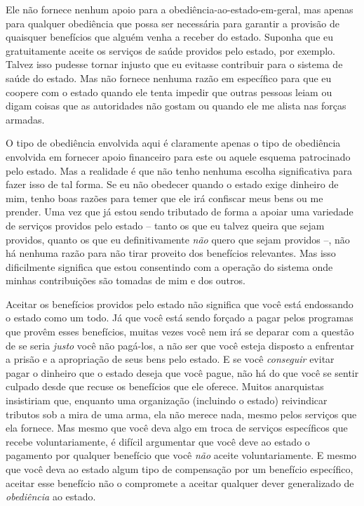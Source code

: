 Ele não fornece nenhum apoio para a obediência-ao-estado-em-geral, mas apenas para qualquer obediência que possa ser necessária para garantir a provisão de quaisquer benefícios que alguém venha a receber do estado. Suponha que eu gratuitamente aceite os serviços de saúde providos pelo estado, por exemplo. Talvez isso pudesse tornar injusto que eu evitasse contribuir para o sistema de saúde do estado. Mas não fornece nenhuma razão em específico para que eu coopere com o estado quando ele tenta impedir que outras pessoas leiam ou digam coisas que as autoridades não gostam ou quando ele me alista nas forças armadas.

O tipo de obediência envolvida aqui é claramente apenas o tipo de obediência envolvida em fornecer apoio financeiro para este ou aquele esquema patrocinado pelo estado. Mas a realidade é que não tenho nenhuma escolha significativa para fazer isso de tal forma. Se eu não obedecer quando o estado exige dinheiro de mim, tenho boas razões para temer que ele irá confiscar meus bens ou me prender. Uma vez que já estou sendo tributado de forma a apoiar uma variedade de serviços providos pelo estado -- tanto os que eu talvez queira que sejam providos, quanto os que eu definitivamente \emph{não} quero que sejam providos --, não há nenhuma razão para não tirar proveito dos benefícios relevantes. Mas isso dificilmente significa que estou consentindo com a operação do sistema onde minhas contribuições são tomadas de mim e dos outros.

Aceitar os benefícios providos pelo estado não significa que você está endossando o estado como um todo. Já que você está sendo forçado a pagar pelos programas que provêm esses benefícios, muitas vezes você nem irá se deparar com a questão de se seria \emph{justo} você não pagá-los, a não ser que você esteja disposto a enfrentar a prisão e a apropriação de seus bens pelo estado. E se você \emph{conseguir} evitar pagar o dinheiro que o estado deseja que você pague, não há do que você se sentir culpado desde que recuse os benefícios que ele oferece. Muitos anarquistas insistiriam que, enquanto uma organização (incluindo o estado) reivindicar tributos sob a mira de uma arma, ela não merece nada, mesmo pelos serviços que ela fornece. Mas mesmo que você deva algo em troca de serviços específicos que recebe voluntariamente, é difícil argumentar que você deve ao estado o pagamento por qualquer benefício que você \emph{não} aceite voluntariamente. E mesmo que você deva ao estado algum tipo de compensação por um benefício específico, aceitar esse benefício não o compromete a aceitar qualquer dever generalizado de \emph{obediência} ao estado.

